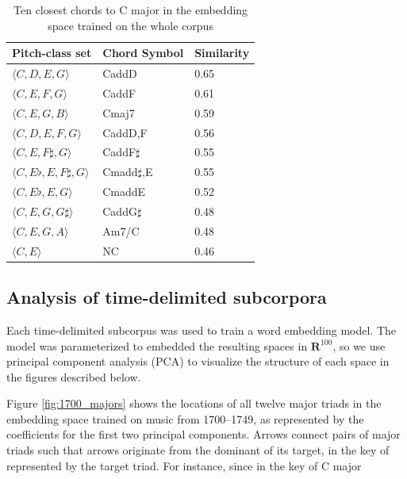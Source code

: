 \begin{table}

 \begin{center}
 \begin{tabular}{|l|l|l|}

  \hline
  Pitch-class set & Chord Symbol & Similarity  \\
\hline
\hline
$\langle C, D, E, G \rangle$ & CaddD & 0.65 \\
\hline
$\langle C, E, F, G \rangle$ & CaddF & 0.61 \\
\hline
$\langle C, E, G, B \rangle$ & Cmaj7 & 0.59 \\
\hline
$\langle C, D, E, F, G \rangle$ & CaddD,F & 0.56 \\
\hline
$\langle C, E, F\sharp, G \rangle$ & CaddF$\sharp$ & 0.55 \\
\hline
$\langle C, E\flat, E, F\sharp, G \rangle$ & Cmadd$\sharp$,E & 0.55 \\
\hline
$\langle C, E\flat, E, G \rangle$ & CmaddE & 0.52 \\
\hline
$\langle C, E, G, G\sharp \rangle$ & CaddG$\sharp$ & 0.48 \\
\hline
$\langle C, E, G, A \rangle$ & Am7/C & 0.48 \\
\hline
$\langle C, E \rangle$ & NC & 0.46 \\
\hline



\end{tabular}
\end{center}

 \caption{Ten closest chords to C major in the embedding space trained on the whole corpus}
 \label{tab:close_to_c}
\end{table}

\subsection{Analysis of time-delimited subcorpora}
Each time-delimited subcorpus was used to train a word embedding model. The model was parameterized to embedded the resulting spaces in $\mathbf{R}^{100}$, so we use principal component analysis (PCA) to visualize the structure of each space in the figures described below.

Figure \ref{fig:1700_majors} shows the locations of all twelve major triads in the embedding space trained on music from 1700--1749, as represented by the coefficients for the first two principal components. Arrows connect pairs of major triads such that arrows originate from the dominant of its target, in the key of represented by the target triad. For instance, since in the key of C major

